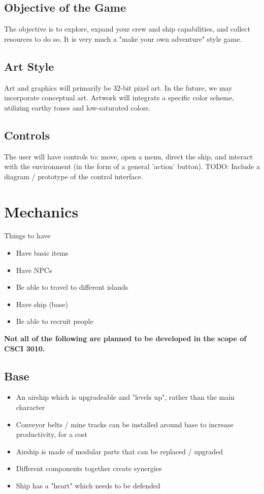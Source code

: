 \documentclass[a4paper]{scrreprt}
\begin{document}
\section{Objective of the Game}
The objective is to explore, expand your crew and ship capabilities, and collect resources to do so. It is very much a "make your own adventure" style game.

\section{Art Style}
Art and graphics will primarily be 32-bit pixel art. In the future, we may incorporate conceptual art. Artwork will integrate a specific color scheme, utilizing earthy tones and low-saturated colors.

\section{Controls}
The user will have controls to: move, open a menu, direct the ship, and interact with the environment (in the form of a general 'action' button). TODO: Include a diagram / prototype of the control interface.



\chapter{Mechanics}

Things to have

\begin{itemize}
    \item Have basic items
    \item Have NPCs
    \item Be able to travel to different islands
    \item Have ship (base)
    \item Be able to recruit people
\end{itemize}

\textbf {Not all of the following are planned to be developed in the scope of CSCI 3010.}

\section{Base}
\begin{itemize}
\item An airship which is upgradeable and "levels up", rather than the main character
\item Conveyor belts / mine tracks can be installed around base to increase productivity, for a cost
\item Airship is made of modular parts that can be replaced / upgraded
\item Different components together create synergies
\item Ship has a "heart" which needs to be defended
\end{itemize}
\end{document}
